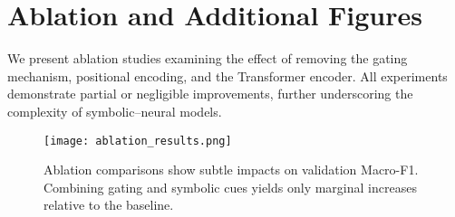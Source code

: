 \documentclass{article}
\begin{document}


\clearpage
\appendix
\section{Ablation and Additional Figures}
We present ablation studies examining the effect of removing the gating mechanism, positional encoding, and the Transformer encoder. All experiments demonstrate partial or negligible improvements, further underscoring the complexity of symbolic–neural models.

\begin{figure}[h]
\centering
\texttt{[image: ablation\_results.png]}
\caption{Ablation comparisons show subtle impacts on validation Macro-F1. Combining gating and symbolic cues yields only marginal increases relative to the baseline.}
\label{fig:ablation}
\end{figure}
\end{document}

